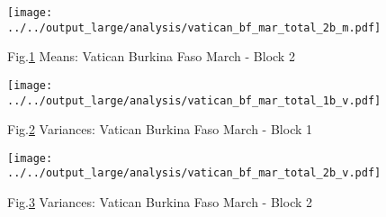 \documentclass[a4paper,12pt]{article}
\begin{document}
\begin{figure}[h!]
\caption{Fig.\ref{fig:fig10} Means: Vatican Burkina Faso March - Block 2}
\texttt{[image: ../../output\_large/analysis/vatican\_bf\_mar\_total\_2b\_m.pdf]}
\label{fig:fig10}
\end{figure}

\begin{figure}[h!]
\caption{Fig.\ref{fig:fig11} Variances: Vatican Burkina Faso March - Block 1}
\texttt{[image: ../../output\_large/analysis/vatican\_bf\_mar\_total\_1b\_v.pdf]}
\label{fig:fig11}
\end{figure}

\begin{figure}[h!]
\caption{Fig.\ref{fig:fig12} Variances: Vatican Burkina Faso March - Block 2}
\texttt{[image: ../../output\_large/analysis/vatican\_bf\_mar\_total\_2b\_v.pdf]}
\label{fig:fig12}
\end{figure}
\end{document}
